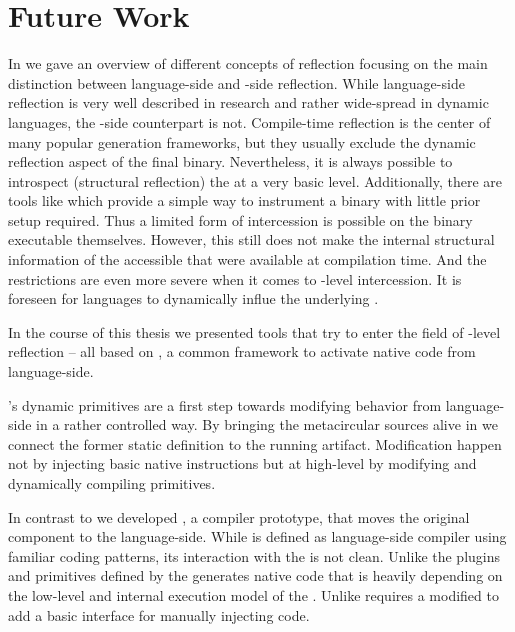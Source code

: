 
\chapter{Future Work}
\minitoc
\introduction

In  we gave an overview of different concepts of reflection focusing on the main distinction between language-side and \VM-side reflection.
While language-side reflection is very well described in research and rather wide-spread in dynamic languages, the \VM-side counterpart is not.
Compile-time reflection is the center of many popular \VM generation frameworks, but they usually exclude the dynamic reflection aspect of the final binary.
Nevertheless, it is always possible to introspect (structural reflection) the \VM at a very basic level.
Additionally, there are tools like \DTrace which provide a simple way to instrument a binary with little prior setup required.
Thus a limited form of intercession is possible on the binary executable themselves.
However, this still does not make the internal structural information of the \VM accessible that were available at compilation time.
And the restrictions are even more severe when it comes to \VM-level intercession.
It is foreseen for languages to dynamically influe the underlying \VM.

In the course of this thesis we presented tools that try to enter the field of \VM-level reflection -- all based on \B, a common framework to activate native code from language-side.

\WF's dynamic primitives are a first step towards modifying \VM behavior from language-side in a rather controlled way.
By bringing the metacircular \VM sources alive in \PH we connect the former static definition to the running artifact.
Modification happen not by injecting basic native instructions but at high-level by modifying and dynamically compiling primitives.

In contrast to \WF we developed \NBJ, a \JIT compiler prototype, that moves the original \VM component to the language-side.
While \NBJ is defined as language-side compiler using familiar coding patterns, its interaction with the \VM is not clean.
Unlike the plugins and primitives defined by \WF the \JIT generates native code that is heavily depending on the low-level and internal execution model of the \VM.
Unlike \WF \NBJ requires a modified \VM to add a basic interface for manually injecting \JIT code.

